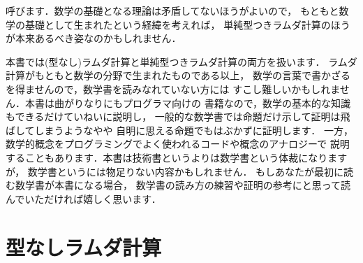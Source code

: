 \documentclass{ltjsbook}%
\begin{document}
呼びます．数学の基礎となる理論は矛盾してないほうがよいので，%
もともと数学の基礎として生まれたという経緯を考えれば，%
単純型つきラムダ計算のほうが本来あるべき姿なのかもしれません．%
\par 本書では(型なし)ラムダ計算と単純型つきラムダ計算の両方を扱います．%
ラムダ計算がもともと数学の分野で生まれたものである以上，%
数学の言葉で書かざるを得ませんので，数学書を読みなれていない方には%
すこし難しいかもしれません．本書は曲がりなりにもプログラマ向けの%
書籍なので，数学の基本的な知識もできるだけていねいに説明し，%
一般的な数学書では命題だけ示して証明は飛ばしてしまうようなやや%
自明に思える命題でもはぶかずに証明します．%
一方，数学的概念をプログラミングでよく使われるコードや概念のアナロジーで%
説明することもあります．本書は技術書というよりは数学書という体裁になりますが，%
数学書というには物足りない内容かもしれません．%
もしあなたが最初に読む数学書が本書になる場合，%
数学書の読み方の練習や証明の参考にと思って読んでいただければ嬉しく思います．%
\fi%
\tableofcontents%
\mainmatter%
\chapter{型なしラムダ計算}%
\label{chap:untyped}%
\end{document}
